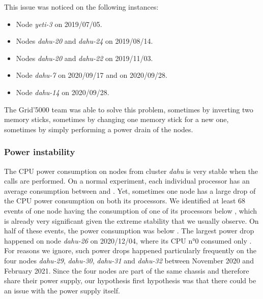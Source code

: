                 This issue was noticed on the following instances:
                \begin{itemize}
                    \item Node \emph{yeti-3} on 2019/07/05.
                    \item Nodes \emph{dahu-20} and \emph{dahu-24} on 2019/08/14.
                    \item Nodes \emph{dahu-20} and \emph{dahu-22} on 2019/11/03.
                    \item Node \emph{dahu-7} on 2020/09/17 and on 2020/09/28.
                    \item Node \emph{dahu-14} on 2020/09/28.
                \end{itemize}

                The Grid'5000 team was able to solve this problem, sometimes by inverting two memory sticks, sometimes
                by changing one memory stick for a new one, sometimes by simply performing a power drain of the nodes.

            \subsubsection{Power instability}%

                The CPU power consumption on nodes from cluster \emph{dahu} is very stable when the \dgemm calls are
                performed. On a normal experiment, each individual processor has an average consumption between
                 and . Yet, sometimes one node has a large drop of the CPU
                power consumption on both its processors. We identified at least 68 events of one node having the
                consumption of one of its processors below , which is already very significant given the
                extreme stability that we usually observe. On half of these events, the power consumption was below
                . The largest power drop happened on node \emph{dahu-26} on 2020/12/04, where its CPU
                n°0 consumed only . For reasons we ignore, such power drops happened particularly
                frequently on the four nodes \emph{dahu-29}, \emph{dahu-30}, \emph{dahu-31} and \emph{dahu-32} between
                November 2020 and February 2021. Since the four nodes are part of the same chassis and therefore share
                their power supply, our hypothesis first hypothesis was that there could be an issue with the power
                supply itself.

